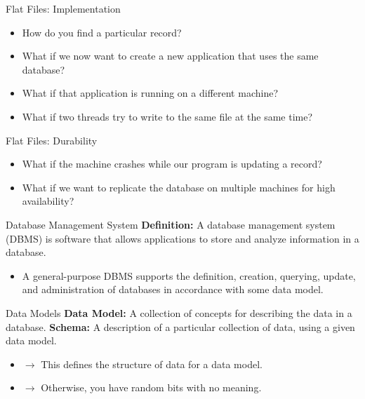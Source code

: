 \begin{frame}{Flat Files: Implementation}
    \begin{itemize}
        \item How do you find a particular record?
        \item What if we now want to create a new application that uses the same database?
        \item What if that application is running on a different machine?
        \item What if two threads try to write to the same file at the same time?
    \end{itemize}
\end{frame}

\begin{frame}{Flat Files: Durability}
    \begin{itemize}
        \item What if the machine crashes while our program is updating a record?
        \item What if we want to replicate the database on multiple machines for high availability?
    \end{itemize}
\end{frame}

\begin{frame}{Database Management System}
    \textbf{Definition:} A database management system (DBMS) is software that allows applications to store and analyze information in a database.
    \vspace{1em}
    \begin{itemize}
        \item A general-purpose DBMS supports the definition, creation, querying, update, and administration of databases in accordance with some data model.
    \end{itemize}
\end{frame}

\begin{frame}{Data Models}
    \textbf{Data Model:} A collection of concepts for describing the data in a database.
    \vspace{1em}
    \textbf{Schema:} A description of a particular collection of data, using a given data model.
    \begin{itemize}
        \item $\rightarrow$ This defines the structure of data for a data model.
        \item $\rightarrow$ Otherwise, you have random bits with no meaning.
    \end{itemize}
\end{frame}

